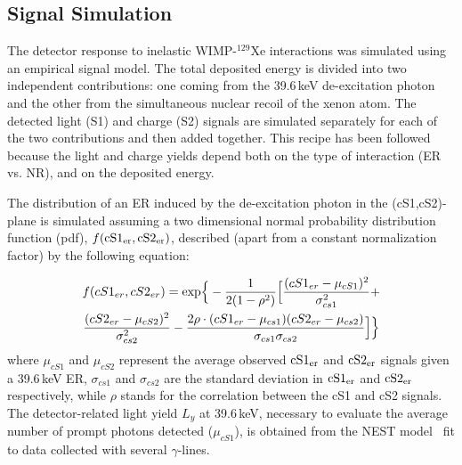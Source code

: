 \subsection{Signal Simulation} 

The detector response to inelastic WIMP-$^{129}$Xe interactions was simulated using an empirical signal model.
The total deposited energy is divided into two independent contributions: one coming from the 39.6\,keV de-excitation photon and the other  from  
the simultaneous nuclear recoil of the xenon atom. The detected light (S1) and charge (S2) signals are simulated separately for each of the two contributions 
and then added together. This recipe has been followed  because the light and charge yields depend both on the type of interaction (ER vs. NR), and on the deposited energy.


The distribution of an ER induced by the de-excitation photon in the (cS1,cS2)-plane  is simulated assuming a two dimensional normal probability distribution function (pdf), $f(\rm{cS1}_{er},\rm{cS2}_{er})$, 
described (apart from a constant normalization factor) by the following equation:

\begin{multline}
	f(cS1_{er},cS2_{er})  = {\rm exp} \Big\{ -\frac{1}{2(1-\rho^2)} \Big[ \frac{(cS1_{er} - \mu_{cS1})^2}{\sigma_{cs1}^2} + \\ 
	 \frac{(cS2_{er} - \mu_{cS2})^2}{\sigma_{cs2}^2} - \frac{2\rho\cdot(cS1_{er} - \mu_{cs1}) (cS2_{er} - \mu_{cs2})} {\sigma_{cs1}\sigma_{cs2}} \Big] \Big\}
\label{f:2dgaus}
\end{multline}
where $\mu_{cS1}$ and $\mu_{cS2}$ 
represent the average observed $\rm{cS1_{er}}$ and $\rm{cS2_{er}}$ signals given a 39.6\,keV ER, $\sigma_{cs1}$ and $\sigma_{cs2}$ are the standard deviation in $\rm{cS1_{er}}$ and $\rm{cS2_{er}}$ respectively,
while $\rho$ stands for the correlation between the cS1 and cS2 signals. The detector-related light yield $L_y$  at 39.6\,keV, necessary to evaluate the average number of prompt photons detected 
($\mu_{cS1}$), is obtained from the NEST model~\cite{NEST,Geant1,Geant2} fit to data collected with several $\gamma$-lines.

